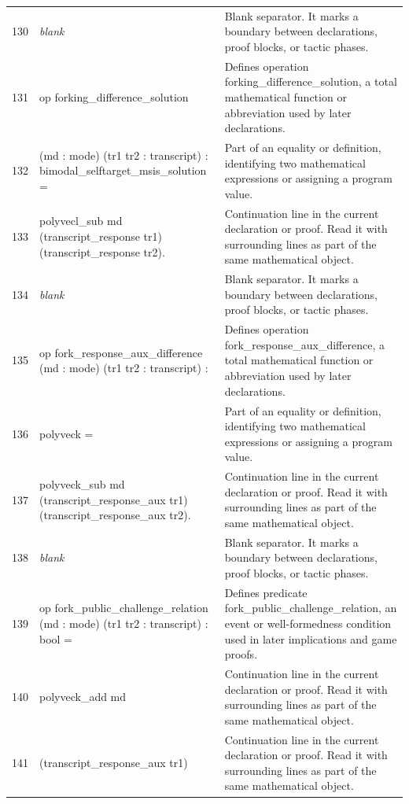 \documentclass[10pt]{article}
\begin{document}
\begin{longtable}{r L{0.53\textwidth} L{0.37\textwidth}}
130 & {\ttfamily\scriptsize \emph{blank}} & Blank separator.  It marks a boundary between declarations, proof blocks, or tactic phases. \\
131 & {\ttfamily\scriptsize op forking\_difference\_solution} & Defines operation forking\_difference\_solution, a total mathematical function or abbreviation used by later declarations. \\
132 & {\ttfamily\scriptsize    (md : mode) (tr1 tr2 : transcript) : bimodal\_selftarget\_msis\_solution =} & Part of an equality or definition, identifying two mathematical expressions or assigning a program value. \\
133 & {\ttfamily\scriptsize   polyvecl\_sub md (transcript\_response tr1) (transcript\_response tr2).} & Continuation line in the current declaration or proof.  Read it with surrounding lines as part of the same mathematical object. \\
134 & {\ttfamily\scriptsize \emph{blank}} & Blank separator.  It marks a boundary between declarations, proof blocks, or tactic phases. \\
135 & {\ttfamily\scriptsize op fork\_response\_aux\_difference (md : mode) (tr1 tr2 : transcript) :} & Defines operation fork\_response\_aux\_difference, a total mathematical function or abbreviation used by later declarations. \\
136 & {\ttfamily\scriptsize   polyveck =} & Part of an equality or definition, identifying two mathematical expressions or assigning a program value. \\
137 & {\ttfamily\scriptsize   polyveck\_sub md (transcript\_response\_aux tr1) (transcript\_response\_aux tr2).} & Continuation line in the current declaration or proof.  Read it with surrounding lines as part of the same mathematical object. \\
138 & {\ttfamily\scriptsize \emph{blank}} & Blank separator.  It marks a boundary between declarations, proof blocks, or tactic phases. \\
139 & {\ttfamily\scriptsize op fork\_public\_challenge\_relation (md : mode) (tr1 tr2 : transcript) : bool =} & Defines predicate fork\_public\_challenge\_relation, an event or well-formedness condition used in later implications and game proofs. \\
140 & {\ttfamily\scriptsize   polyveck\_add md} & Continuation line in the current declaration or proof.  Read it with surrounding lines as part of the same mathematical object. \\
141 & {\ttfamily\scriptsize     (transcript\_response\_aux tr1)} & Continuation line in the current declaration or proof.  Read it with surrounding lines as part of the same mathematical object. \\

\end{longtable}
\end{document}
